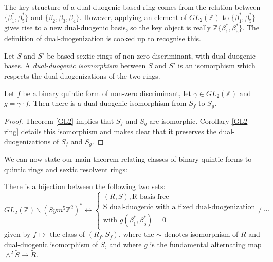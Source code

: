 \documentclass{article}
\begin{document}
The key structure of a dual-duogenic based ring comes from the relation between $\{ \beta_1^*, \beta_5^* \}$ and $\{ \beta_2, \beta_3, \beta_4 \}$.  However, applying an element of $GL_2(\mathbb{Z})$ to $\{ \beta_1^*, \beta_5^* \}$ gives rise to a new dual-duogenic basis, so the key object is really $\mathbb{Z} \{ \beta_1^*, \beta_5^* \}$.  The definition of dual-duogenization is cooked up to recognise this.

\begin{definition}
Let $S$ and $S'$ be based sextic rings of non-zero discriminant, with dual-duogenic bases.  A \emph{dual-duogenic isomorphism} between $S$ and $S'$ is an isomorphism which respects the dual-duogenizations of the two rings.
\end{definition}

\begin{corollary} \label{GL2 dual duogenic}
Let $f$ be a binary quintic form of non-zero discriminant, let $\gamma \in GL_2(\mathbb{Z})$ and $g = \gamma \cdot f$.  Then 
there is a dual-duogenic isomorphism from $S_f$ to $S_g$.
\end{corollary}
\begin{proof}
Theorem \ref{GL2} implies that $S_f$ and $S_g$ are isomorphic.  Corollary \ref{GL2 ring} details this isomorphism and makes clear that it preserves the dual-duogenizations of $S_f$ and $S_g$.
\end{proof}

We can now state our main theorem relating classes of binary quintic forms to quintic rings and sextic resolvent rings:
\begin{theorem}
There is a bijection between the following two sets:
\begin{equation}
GL_2(\mathbb{Z}) \backslash (Sym^5 \mathbb{Z}^2)^* \leftrightarrow
\begin{cases}
(R,S), \text{R basis-free} \\
\text{S dual-duogenic with a fixed dual-duogenization} \\
\text{with } g(\beta_1^*,\beta_5^*) = 0 
\end{cases}
 / \sim
\end{equation}
given by $f \mapsto$ the class of $(R_f, S_f)$, where the $\sim$ denotes isomorphism of $R$ and dual-duogenic isomorphism of $S$, and where $g$ is the fundamental alternating map $\wedge^2 \tilde{S} \to \tilde{R}$.
\end{theorem}
\end{document}
